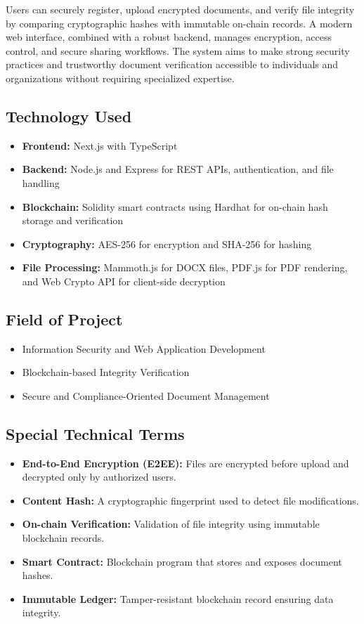 \documentclass[12pt]{article}
\begin{document}
Users can securely register, upload encrypted documents, and verify file integrity by comparing cryptographic hashes with immutable on-chain records. A modern web interface, combined with a robust backend, manages encryption, access control, and secure sharing workflows. The system aims to make strong security practices and trustworthy document verification accessible to individuals and organizations without requiring specialized expertise.

\subsection{Technology Used}
\begin{itemize}
\item \textbf{Frontend:} Next.js with TypeScript
\item \textbf{Backend:} Node.js and Express for REST APIs, authentication, and file handling
\item \textbf{Blockchain:} Solidity smart contracts using Hardhat for on-chain hash storage and verification
\item \textbf{Cryptography:} AES-256 for encryption and SHA-256 for hashing \cite{nist197}
\item \textbf{File Processing:} Mammoth.js for DOCX files, PDF.js for PDF rendering, and Web Crypto API for client-side decryption
\end{itemize}

\subsection{Field of Project}
\begin{itemize}
\item Information Security and Web Application Development
\item Blockchain-based Integrity Verification
\item Secure and Compliance-Oriented Document Management
\end{itemize}

\subsection{Special Technical Terms}
\begin{itemize}
\item \textbf{End-to-End Encryption (E2EE):} Files are encrypted before upload and decrypted only by authorized users.
\item \textbf{Content Hash:} A cryptographic fingerprint used to detect file modifications.
\item \textbf{On-chain Verification:} Validation of file integrity using immutable blockchain records.
\item \textbf{Smart Contract:} Blockchain program that stores and exposes document hashes.
\item \textbf{Immutable Ledger:} Tamper-resistant blockchain record ensuring data integrity.
\end{itemize}
\end{document}
